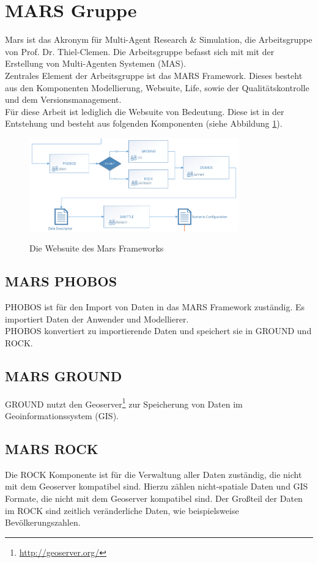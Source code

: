 \documentclass[10pt,conference,compsocconf]{IEEEtran}
\begin{document}
\section{MARS Gruppe}
Mars ist das Akronym für Multi-Agent Research \& Simulation, die Arbeitsgruppe von Prof. Dr. Thiel-Clemen. Die Arbeitsgruppe befasst sich mit mit der Erstellung von Multi-Agenten Systemen (MAS).\\
Zentrales Element der Arbeitsgruppe ist das MARS Framework. Dieses besteht aus den Komponenten Modellierung, Websuite, Life, sowie der Qualitätskontrolle und dem Versionsmanagement.\\
Für diese Arbeit ist lediglich die Websuite von Bedeutung. Diese ist in der Entstehung und besteht aus folgenden Komponenten (siehe Abbildung \ref{img:mars_websuite}).

\begin{figure}[H]
  \centering
  	\includegraphics[height=114pt]{img/mars_websuite}\\
  \caption[]{Die Websuite des Mars Frameworks}
  \label{img:mars_websuite}
\end{figure}

\subsection{MARS PHOBOS}
PHOBOS ist für den Import von Daten in das MARS Framework zuständig. Es importiert Daten der Anwender und Modellierer.\\
PHOBOS konvertiert zu importierende Daten und speichert sie in GROUND und ROCK.

\subsection{MARS GROUND}
GROUND nutzt den Geoserver\footnote{\url{http://geoserver.org/}} zur Speicherung von Daten im Geoinformationssystem (GIS). 

\subsection{MARS ROCK}
Die ROCK Komponente ist für die Verwaltung aller Daten zuständig, die nicht mit dem Geoserver kompatibel sind. Hierzu zählen nicht-spatiale Daten und GIS Formate, die nicht mit dem Geoserver kompatibel sind. Der Großteil der Daten im ROCK sind zeitlich veränderliche Daten, wie beispielsweise Bevölkerungszahlen.
\end{document}
